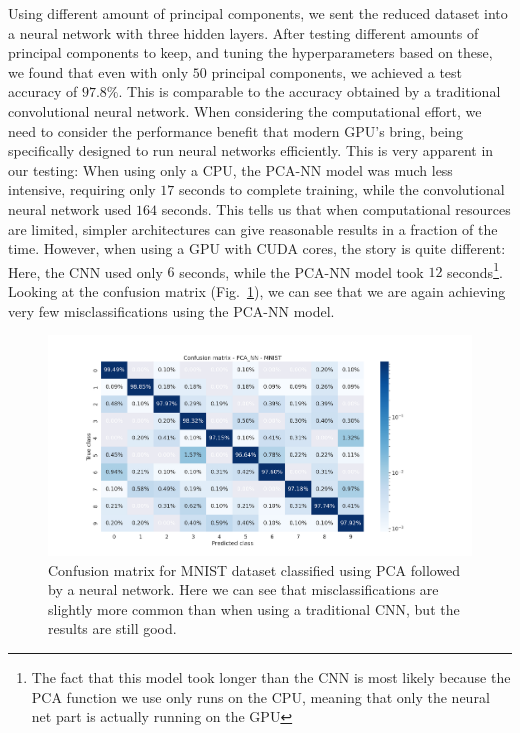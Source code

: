 \documentclass[onecolumn,10pt,cleanfoot]{asme2ej}
\begin{document}
Using different amount of principal components, we sent the reduced dataset into a neural network with three hidden layers. After testing different amounts of principal components to keep, and tuning the hyperparameters based on these, we found that even with only $50$ principal components, we achieved a test accuracy of $97.8\%$. This is comparable to the accuracy obtained by a traditional convolutional neural network. When considering the computational effort, we need to consider the performance benefit that modern GPU's bring, being specifically designed to run neural networks efficiently. This is very apparent in our testing: When using only a CPU, the PCA-NN model was much less intensive, requiring only $17$ seconds to complete training, while the convolutional neural network used $164$ seconds. This tells us that when computational resources are limited, simpler architectures can give reasonable results in a fraction of the time. However, when using a GPU with CUDA cores, the story is quite different: Here, the CNN used only $6$ seconds, while the PCA-NN model took $12$ seconds\footnote{The fact that this model took longer than the CNN is most likely because the PCA function we use only runs on the CPU, meaning that only the neural net part is actually running on the GPU}. Looking at the confusion matrix (Fig.~\ref{mnistheatmap_pcann}), we can see that we are again achieving very few misclassifications using the PCA-NN model.

\begin{figure}[H]
\centerline{\includegraphics[width=8in]{figure/conf_pca_nn_MNIST.png}}
\caption{Confusion matrix for MNIST dataset classified using PCA followed by a neural network. Here we can see that misclassifications are slightly more common than when using a traditional CNN, but the results are still good.}
\label{mnistheatmap_pcann}
\end{figure}
\end{document}

